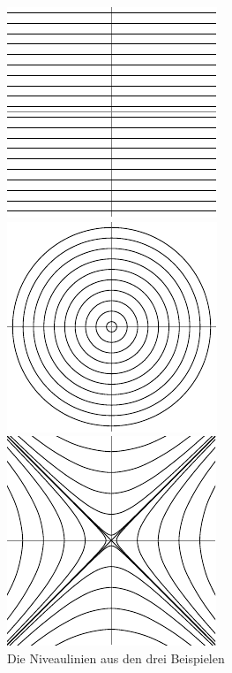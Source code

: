 \documentclass[../main.tex]{subfiles}
\begin{document}
\begin{figure}[htb] 
  \centering
  \begin{minipage}{0.33\textwidth}
    \centering
    \includegraphics{figures/niveauset1}
  \end{minipage}%
  \begin{minipage}{0.33\textwidth}
    \centering
    \includegraphics{figures/niveauset2}
  \end{minipage}%
  \begin{minipage}{0.33\textwidth}
    \centering
    \includegraphics{figures/niveauset3}
  \end{minipage}%
  \caption{Die Niveaulinien aus den drei Beispielen}%
  \label{fig:niveausets}
\end{figure}
\end{document}
